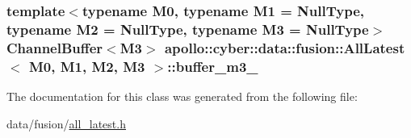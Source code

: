 \hypertarget{classapollo_1_1cyber_1_1data_1_1fusion_1_1AllLatest_a3e12a49b61212793f208880c19ed7819}{
\subsubsection[{buffer\-\_\-m3\-\_\-}]{\setlength{\rightskip}{0pt plus 5cm}template$<$typename M0, typename M1 = Null\-Type, typename M2 = Null\-Type, typename M3 = Null\-Type$>$ {\bf Channel\-Buffer}$<$M3$>$ {\bf apollo\-::cyber\-::data\-::fusion\-::\-All\-Latest}$<$ M0, M1, M2, M3 $>$\-::buffer\-\_\-m3\-\_\-\hspace{0.3cm}{\ttfamily [private]}}}\label{classapollo_1_1cyber_1_1data_1_1fusion_1_1AllLatest_a3e12a49b61212793f208880c19ed7819}


The documentation for this class was generated from the following file\-:\begin{DoxyCompactItemize}
\item 
data/fusion/\hyperlink{all__latest_8h}{all\-\_\-latest.\-h}\end{DoxyCompactItemize}
